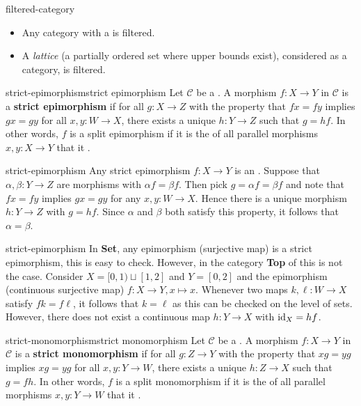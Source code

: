 \begin{example}{filtered-category}
    \begin{itemize}
        \item Any category with a  is filtered.
        \item A \textit{lattice} (a partially ordered set where upper bounds exist), considered as a category, is filtered.
    \end{itemize}
\end{example}

\begin{topic}{strict-epimorphism}{strict epimorphism}
    Let $\mathcal{C}$ be a . A morphism $f \colon X \to Y$ in $\mathcal{C}$ is a \textbf{strict epimorphism} if for all $g \colon X \to Z$ with the property that $fx = fy$ implies $gx = gy$ for all $x, y \colon W \to X$, there exists a unique $h \colon Y \to Z$ such that $g = hf$. In other words, $f$ is a split epimorphism if it is the  of all parallel morphisms $x, y \colon X \to Y$ that it .
\end{topic}

\begin{example}{strict-epimorphism}
    Any strict epimorphism $f \colon X \to Y$ is an . Suppose that $\alpha, \beta \colon Y \to Z$ are morphisms with $\alpha f = \beta f$. Then pick $g = \alpha f = \beta f$ and note that $fx = fy$ implies $gx = gy$ for any $x, y \colon W \to X$. Hence there is a unique morphism $h \colon Y \to Z$ with $g = hf$. Since $\alpha$ and $\beta$ both satisfy this property, it follows that $\alpha = \beta$.
\end{example}

\begin{example}{strict-epimorphism}
    In \textbf{Set}, any epimorphism (surjective map) is a strict epimorphism, this is easy to check. However, in the category \textbf{Top} of  this is not the case. Consider $X = [0, 1) \sqcup [1, 2]$ and $Y = [0, 2]$ and the epimorphism (continuous surjective map) $f \colon X \to Y, x \mapsto x$. Whenever two maps $k, \ell \colon W \to X$ satisfy $fk = f\ell$, it follows that $k = \ell$ as this can be checked on the level of sets. However, there does not exist a continuous map $h \colon Y \to X$ with $\textup{id}_X = hf$.
\end{example}

\begin{topic}{strict-monomorphism}{strict monomorphism}
    Let $\mathcal{C}$ be a . A morphism $f \colon X \to Y$ in $\mathcal{C}$ is a \textbf{strict monomorphism} if for all $g \colon Z \to Y$ with the property that $xg = yg$ implies $xg = yg$ for all $x, y \colon Y \to W$, there exists a unique $h \colon Z \to X$ such that $g = fh$. In other words, $f$ is a split monomorphism if it is the  of all parallel morphisms $x, y \colon Y \to W$ that it .
\end{topic}

